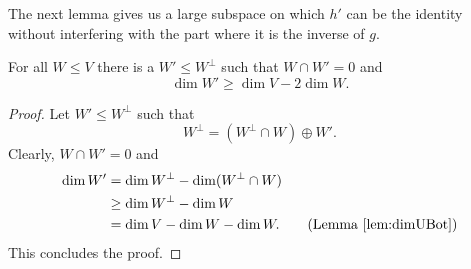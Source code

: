 The next lemma gives us a large subspace on which $h'$ can be the identity without interfering with the part where it is the inverse of $g$.
		
\begin{lemma}\label{lem:largeOrthogonal}
	For all $W\leq V$ there is a $W'\leq W^\bot$ such that $W\cap W'=0$ and \[\dim W'\geq \dim V-2\dim W.\]
\end{lemma}
\begin{proof}
	Let $W'\leq W^\bot$ such that 
	\[W^\bot=(W^\bot\cap W)\oplus W'.\]
	Clearly, $W\cap W'=0$ and 
	\begin{align*}
		\dim W' & =\dim W^\bot - \dim (W^\bot\cap W)                   \\
		        & \geq \dim W^\bot- \dim W                             \\
		        & =\dim V-\dim W-\dim W .\tag{Lemma \ref{lem:dimUBot}} 
	\end{align*}
	This concludes the proof.
\end{proof}
		
		
		
